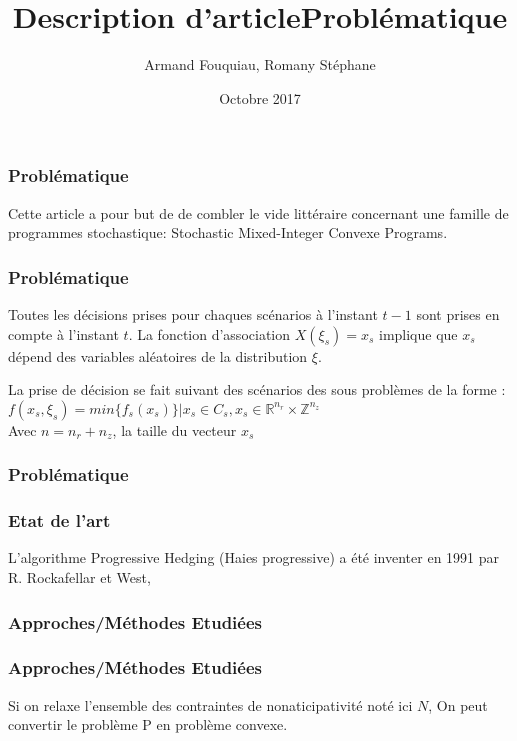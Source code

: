 \documentclass[10pt]{beamer}
\title{Description d'article}
\author{Armand Fouquiau, Romany Stéphane}
\institute{Université Paris-Sud}
\date{Octobre 2017}
\newcommand{\reels}{\mathbb{R}}
\newcommand{\integers}{\mathbb{Z}}
\begin{document}
    \begin{frame}
    \titlepage
    \end{frame}

    
        \begin{frame}
        \frametitle{Problématique}
        Cette article a pour but de de combler le vide littéraire concernant une famille de programmes stochastique: Stochastic Mixed-Integer Convexe Programs.
    \end{frame}
        
    \begin{frame}
        \frametitle{Problématique}
        Toutes les décisions prises pour chaques scénarios à l'instant $t-1$ sont prises en compte à l'instant $t$. La fonction d'association $X(\xi_s) = x_s$ implique que $x_s$ dépend des variables aléatoires de la distribution $\xi$.
    \end{frame}
    
    
    \begin{frame}
        \title{Problématique}
        La prise de décision se fait suivant des scénarios des sous problèmes de la forme : 
         $f(x_s, \xi_{s}) = min \{f_s(x_s)\} | x_s \in C_s, x_s \in \reels^{n_r} \times \integers^{n_z}$\\
         Avec $n = n_r + n_z$, la taille du vecteur $x_s$
    \end{frame}
    
    
    \begin{frame}
        \frametitle{Problématique}
                
    \end{frame}
        
    \begin{frame}
        \frametitle{Etat de l'art}
        L'algorithme Progressive Hedging (Haies progressive) a été inventer en 1991 par R. Rockafellar et West, 
    \end{frame}
        
    \begin{frame}
        \frametitle{Approches/Méthodes Etudiées}
    \end{frame}
    
    \begin{frame}
        \frametitle{Approches/Méthodes Etudiées}
        Si on relaxe l'ensemble des contraintes de nonaticipativité noté ici $N$, On peut convertir le problème P en problème convexe.
    \end{frame}
    
\end{document}
